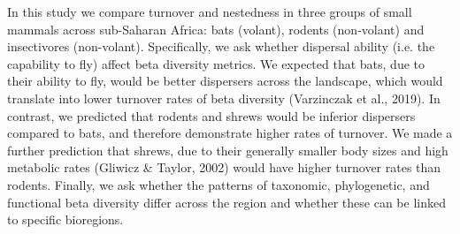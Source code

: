 \documentclass{article}
\begin{document}
\vspace{5mm}
In this study we compare turnover and nestedness in three groups of small mammals across sub-Saharan Africa: bats (volant), rodents (non-volant) and insectivores (non-volant). Specifically, we ask whether dispersal ability (i.e. the capability to fly) affect beta diversity metrics. We expected that bats, due to their ability to fly, would be better dispersers across the landscape, which would translate into lower turnover rates of beta diversity (Varzinczak et al., 2019). In contrast, we predicted that rodents and shrews would be inferior dispersers compared to bats, and therefore demonstrate higher rates of turnover. We made a further prediction that shrews, due to their generally smaller body sizes and high metabolic rates (Gliwicz \& Taylor, 2002) would have higher turnover rates than rodents. Finally, we ask whether the patterns of taxonomic, phylogenetic, and functional beta diversity differ across the region and whether these can be linked to specific bioregions.  
\end{document}
